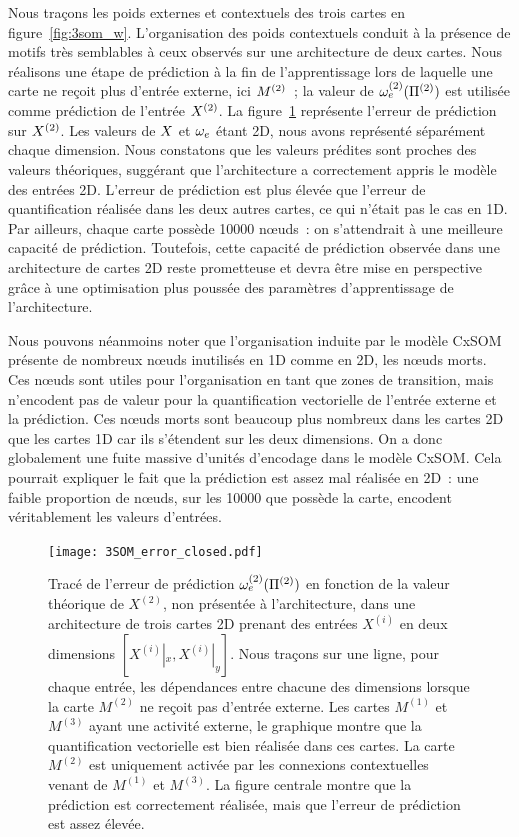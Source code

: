 \documentclass[../main]{subfiles}
\begin{document}
Nous traçons les poids externes et contextuels des trois cartes en figure~\ref{fig:3som_w}.
L'organisation des poids contextuels conduit à la présence de motifs très semblables à ceux observés sur une architecture de deux cartes.
Nous réalisons une étape de prédiction à la fin de l'apprentissage lors de laquelle une carte ne reçoit plus d'entrée externe, ici $M^{({2})}$~; la valeur de $\omega_{e}^{({2})}(\Pi^{({2})})$ est utilisée comme prédiction de l'entrée $X^{({2})}$.
La figure~\ref{fig:3som_pred} représente l'erreur de prédiction sur $X^{({2})}$.
Les valeurs de $X$ et $\omega_e$ étant 2D, nous avons représenté séparément chaque dimension. 
Nous constatons que les valeurs prédites sont proches des valeurs théoriques, suggérant que l'architecture a correctement appris le modèle des entrées 2D.
L'erreur de prédiction est plus élevée que l'erreur de quantification réalisée dans les deux autres cartes, ce qui n'était pas le cas en 1D.
Par ailleurs, chaque carte possède 10000 n\oe{}uds~: on s'attendrait à une meilleure capacité de prédiction. Toutefois, cette capacité de prédiction observée dans une architecture de cartes 2D reste prometteuse et devra être mise en perspective grâce à une optimisation plus poussée des paramètres d'apprentissage de l'architecture.

Nous pouvons néanmoins noter que l'organisation induite par le modèle CxSOM présente de nombreux n\oe{}uds inutilisés en 1D comme en 2D, les n\oe{}uds morts. Ces n\oe{}uds sont utiles pour l'organisation en tant que zones de transition, mais n'encodent pas de valeur pour la quantification vectorielle de l'entrée externe et la prédiction. Ces n\oe{}uds morts sont beaucoup plus nombreux dans les cartes 2D que les cartes 1D car ils s'étendent sur les deux dimensions. On a donc globalement une fuite massive d'unités d'encodage dans le modèle CxSOM. 
Cela pourrait expliquer le fait que la prédiction est assez mal réalisée en 2D~: une faible proportion de n\oe{}uds, sur les 10000 que possède la carte, encodent véritablement les valeurs d'entrées.


\begin{figure}
\centering\texttt{[image: 3SOM\_error\_closed.pdf]}
\caption{Tracé de l'erreur de prédiction $\omega_e^{({2})}(\Pi^{({2})})$ en fonction de la valeur théorique de $X^{(2)}$, non présentée à l'architecture, dans une architecture de trois cartes 2D prenant des entrées $X^{(i)}$ en deux dimensions $[X^{(i)}|_x, X^{(i)}|_y]$. Nous traçons sur une ligne, pour chaque entrée, les dépendances entre chacune des dimensions
lorsque la carte $M^{(2)}$ ne reçoit pas d'entrée externe. Les cartes $M^{(1)}$ et $M^{(3)}$ ayant une activité externe, le graphique montre que la quantification vectorielle est bien réalisée dans ces cartes. La carte $M^{(2)}$ est uniquement activée par les connexions contextuelles venant de $M^{(1)}$ et $M^{(3)}$. La figure centrale montre que la prédiction est correctement réalisée, mais que l'erreur de prédiction est assez élevée. \label{fig:3som_pred}}
\end{figure}
\end{document}

